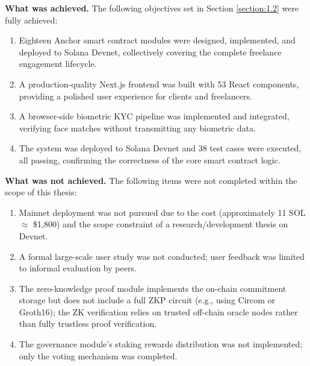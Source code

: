 \textbf{What was achieved.} The following objectives set in Section \ref{section:1.2} were fully achieved:
\begin{enumerate}
    \item Eighteen Anchor smart contract modules were designed, implemented, and deployed to Solana Devnet, collectively covering the complete freelance engagement lifecycle.
    \item A production-quality Next.js frontend was built with 53 React components, providing a polished user experience for clients and freelancers.
    \item A browser-side biometric KYC pipeline was implemented and integrated, verifying face matches without transmitting any biometric data.
    \item The system was deployed to Solana Devnet and 38 test cases were executed, all passing, confirming the correctness of the core smart contract logic.
\end{enumerate}

\textbf{What was not achieved.} The following items were not completed within the scope of this thesis:
\begin{enumerate}
    \item Mainnet deployment was not pursued due to the cost (approximately 11 SOL $\approx$ \$1,800) and the scope constraint of a research/development thesis on Devnet.
    \item A formal large-scale user study was not conducted; user feedback was limited to informal evaluation by peers.
    \item The zero-knowledge proof module implements the on-chain commitment storage but does not include a full ZKP circuit (e.g., using Circom or Groth16); the ZK verification relies on trusted off-chain oracle nodes rather than fully trustless proof verification.
    \item The governance module's staking rewards distribution was not implemented; only the voting mechanism was completed.
\end{enumerate}

